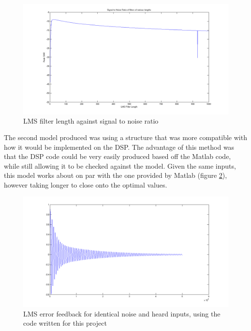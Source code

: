 \begin{figure}[H]
	\centering
	\includegraphics[width=\textwidth]{./img/lmssnr_graph.png}
	\caption{LMS filter length against signal to noise ratio}
	\label{fig:modellmsfiltlen}
\end{figure}

\noindent The second model produced was using a structure that was more compatible with how it would be implemented on the DSP.
The advantage of this method was that the DSP code could be very easily produced based off the Matlab code, while still allowing it to be checked against the model.
Given the same inputs, this model works about on par with the one provided by Matlab (figure \ref{fig:modellmscancelmine}), however taking longer to close onto the optimal values.

\begin{figure}[H]
	\centering
	\includegraphics[width=\textwidth]{./img/lmssnr_cancel_mine.png}
	\caption{LMS error feedback for identical noise and heard inputs, using the code written for this project}
	\label{fig:modellmscancelmine}
\end{figure}

